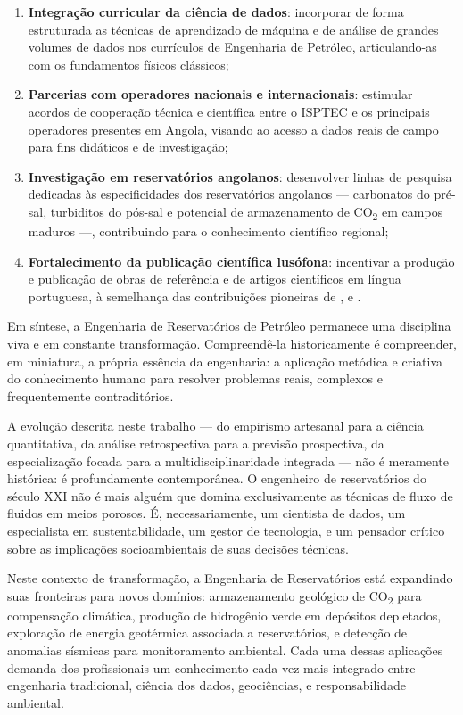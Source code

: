 \documentclass[
  12pt,
  a4paper,
  oneside,
  brazilian,
  sumario=tradicional
]{abntex2}
\begin{document}
\begin{enumerate}[label=\roman*.]
  \item \textbf{Integração curricular da ciência de dados}: incorporar
    de forma estruturada as técnicas de aprendizado de máquina e de
    análise de grandes volumes de dados nos currículos de Engenharia
    de Petróleo, articulando-as com os fundamentos físicos clássicos;
  \item \textbf{Parcerias com operadores nacionais e internacionais}:
    estimular acordos de cooperação técnica e científica entre o ISPTEC
    e os principais operadores presentes em Angola, visando ao acesso
    a dados reais de campo para fins didáticos e de investigação;
  \item \textbf{Investigação em reservatórios angolanos}: desenvolver
    linhas de pesquisa dedicadas às especificidades dos reservatórios
    angolanos — carbonatos do pré-sal, turbiditos do pós-sal e
    potencial de armazenamento de CO\textsubscript{2} em campos
    maduros —, contribuindo para o conhecimento científico regional;
  \item \textbf{Fortalecimento da publicação científica lusófona}:
    incentivar a produção e publicação de obras de referência e de
    artigos científicos em língua portuguesa, à semelhança das
    contribuições pioneiras de \cite{rosa2006}, \cite{ramos2016}
    e \cite{ramos2020}.
\end{enumerate}

Em síntese, a Engenharia de Reservatórios de Petróleo permanece uma
disciplina viva e em constante transformação. Compreendê-la
historicamente é compreender, em miniatura, a própria essência da
engenharia: a aplicação metódica e criativa do conhecimento humano
para resolver problemas reais, complexos e frequentemente contraditórios.

A evolução descrita neste trabalho — do empirismo artesanal para a
ciência quantitativa, da análise retrospectiva para a previsão
prospectiva, da especialização focada para a multidisciplinaridade
integrada — não é meramente histórica: é profundamente contemporânea.
O engenheiro de reservatórios do século XXI não é mais alguém que domina
exclusivamente as técnicas de fluxo de fluidos em meios porosos. É,
necessariamente, um cientista de dados, um especialista em sustentabilidade,
um gestor de tecnologia, e um pensador crítico sobre as implicações
socioambientais de suas decisões técnicas.

Neste contexto de transformação, a Engenharia de Reservatórios está
expandindo suas fronteiras para novos domínios: armazenamento geológico
de CO\textsubscript{2} para compensação climática, produção de hidrogênio
verde em depósitos depletados, exploração de energia geotérmica associada
a reservatórios, e detecção de anomalias sísmicas para monitoramento
ambiental. Cada uma dessas aplicações demanda dos profissionais um
conhecimento cada vez mais integrado entre engenharia tradicional,
ciência dos dados, geociências, e responsabilidade ambiental.
\end{document}
